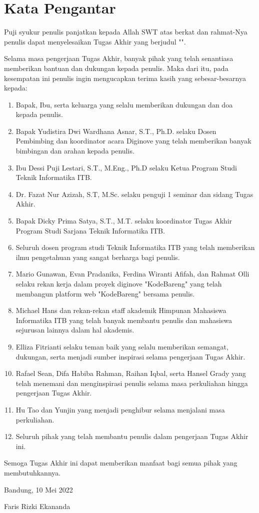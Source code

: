 \chapter*{Kata Pengantar}

Puji syukur penulis panjatkan kepada Allah SWT atas berkat dan rahmat-Nya penulis dapat menyelesaikan Tugas Akhir yang berjudul "\thetitle".

Selama masa pengerjaan Tugas Akhir, banyak pihak yang telah senantiasa memberikan bantuan dan dukungan kepada penulis. Maka dari itu, pada kesempatan ini penulis ingin mengucapkan terima kasih yang sebesar-besarnya kepada:

\begin{enumerate}
  \item Bapak, Ibu, serta keluarga yang selalu memberikan dukungan dan doa kepada penulis.
  \item Bapak Yudistira Dwi Wardhana Asnar, S.T., Ph.D. selaku Dosen Pembimbing dan koordinator acara Diginove yang telah memberikan banyak bimbingan dan arahan kepada penulis.
  \item Ibu Dessi Puji Lestari, S.T., M.Eng., Ph.D selaku Ketua Program Studi Teknik Informatika ITB.
  \item Dr. Fazat Nur Azizah, S.T, M.Sc. selaku penguji 1 seminar dan sidang Tugas Akhir.
  \item Bapak Dicky Prima Satya, S.T., M.T. selaku koordinator Tugas Akhir Program Studi Sarjana Teknik Informatika ITB.
  \item Seluruh dosen program studi Teknik Informatika ITB yang telah memberikan ilmu pengetahuan yang sangat berharga bagi penulis.
  \item Mario Gunawan, Evan Pradanika, Ferdina Wiranti Afifah, dan Rahmat Olli selaku rekan kerja dalam proyek diginove "KodeBareng" yang telah membangun platform web "KodeBareng" bersama penulis.
  \item Michael Hans dan rekan-rekan staff akademik Himpunan Mahasiswa Informatika ITB yang telah banyak membantu penulis dan mahasiswa sejurusan lainnya dalam hal akademis.
  \item Elliza Fitrianti selaku teman baik yang selalu memberikan semangat, dukungan, serta menjadi sumber inspirasi selama pengerjaan Tugas Akhir.
  \item Rafael Sean, Difa Habiba Rahman, Raihan Iqbal, serta Hansel Grady yang telah menemani dan menginspirasi penulis selama masa perkuliahan hingga pengerjaan Tugas Akhir.
  \item Hu Tao dan Yunjin yang menjadi penghibur selama menjalani masa perkuliahan.
  \item Seluruh pihak yang telah membantu penulis dalam pengerjaan Tugas Akhir ini.
\end{enumerate}

Semoga Tugas Akhir ini dapat memberikan manfaat bagi semua pihak yang membutuhkannya.

\begin{flushright}
  Bandung, 10 Mei 2022


  Faris Rizki Ekananda
\end{flushright}